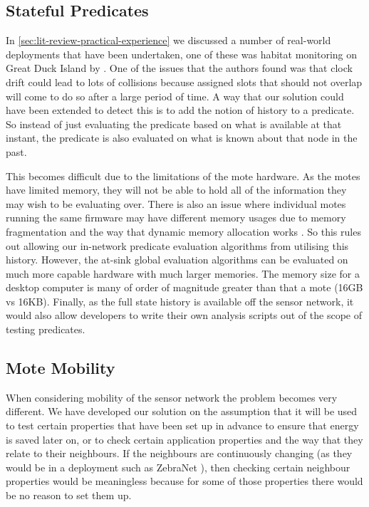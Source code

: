\subsection{Stateful Predicates}

In \autoref{sec:lit-review-practical-experience} we discussed a number of real-world deployments that have been undertaken, one of these was habitat monitoring on Great Duck Island by \citeauthor{SzewczykPMC04}. One of the issues that the authors found was that clock drift could lead to lots of collisions because assigned slots that should not overlap will come to do so after a large period of time. A way that our solution could have been extended to detect this is to add the notion of history to a predicate. So instead of just evaluating the predicate based on what is available at that instant, the predicate is also evaluated on what is known about that node in the past.

This becomes difficult due to the limitations of the mote hardware. As the motes have limited memory, they will not be able to hold all of the information they may wish to be evaluating over. There is also an issue where individual motes running the same firmware may have different memory usages due to memory fragmentation and the way that dynamic memory allocation works \cite{Dai:2004:EEL:1031495.1031516}. So this rules out allowing our in-network predicate evaluation algorithms from utilising this history. However, the at-sink global evaluation algorithms can be evaluated on much more capable hardware with much larger memories. The memory size for a desktop computer is many of order of magnitude greater than that a mote (16GB vs 16KB). Finally, as the full state history is available off the sensor network, it would also allow developers to write their own analysis scripts out of the scope of testing predicates.


\subsection{Mote Mobility}

When considering mobility of the sensor network the problem becomes very different. We have developed our solution on the assumption that it will be used to test certain properties that have been set up in advance to ensure that energy is saved later on, or to check certain application properties and the way that they relate to their neighbours. If the neighbours are continuously changing (as they would be in a deployment such as ZebraNet \cite{Juang:2002:ECW:635508.605408}), then checking certain neighbour properties would be meaningless because for some of those properties there would be no reason to set them up.

